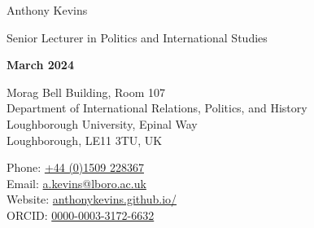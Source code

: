 \documentclass[letterpaper,fontsize=10.5pt]{scrartcl}
\begin{document}


\huge Anthony Kevins\\
\begin{minipage}[t]{.75\linewidth}
	\large Senior Lecturer in Politics and International Studies\\ 
\end{minipage}%
\begin{minipage}[t]{.25\linewidth}
	\raggedleft
	\scriptsize \textbf{March 2024}\\
\end{minipage}%
\normalsize

\hrulefill

\begin{minipage}[p]{.6\linewidth}
	\raggedright
	\medskip
	Morag Bell Building, Room 107\\
	Department of International Relations, Politics, and History\\
	Loughborough University, Epinal Way\\
	Loughborough, LE11 3TU, UK\\
	\medskip
\end{minipage}%
\begin{minipage}[p]{.4\linewidth}
	\raggedleft
	\medskip
	Phone: \href{tel:+4401509228367}{+44 (0)1509 228367}\\
	Email: \href{mailto:a.kevins@lboro.ac.uk}{a.kevins@lboro.ac.uk}\\
	Website: \href{https://anthonykevins.github.io/}{anthonykevins.github.io/}\\
	ORCID: \href{https://orcid.org/0000-0003-3172-6632}{0000-0003-3172-6632}\\
	\medskip%
\end{minipage}

\hrulefill

\end{document}

